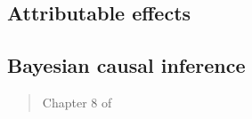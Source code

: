 \documentclass[12pt]{article}
\begin{document}
\begin{verse}  \end{verse}

\begin{verse}  \end{verse}

\begin{verse}  \end{verse}

\begin{verse}  \end{verse}

\subsection{Attributable effects}

\begin{verse}  \end{verse}

\begin{verse}  \end{verse}

\begin{verse}  \end{verse}

\subsection{Bayesian causal inference}

\begin{verse}  \end{verse}

\begin{verse} Chapter 8 of  \end{verse}

\begin{verse}  \end{verse}

\begin{verse}  \end{verse}

\begin{verse}  \end{verse}

\clearpage

\end{document}
